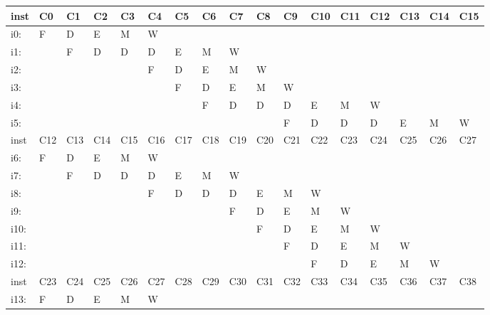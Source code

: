 \documentclass{article}
\begin{document}
\begin{table}[H]
\begin{tabular}{|l|l|l|l|l|l|l|l|l|l|l|l|l|l|l|l|l|}
\hline
inst & C0  & C1  & C2  & C3  & C4  & C5  & C6  & C7  & C8  & C9  & C10 & C11 & C12 & C13 & C14 & C15 \\ \hline
i0:  &  F  &  D  &  E  &  M  &  W  &     &     &     &     &     &     &     &     &     &     &     \\ \hline
i1:  &     &  F  &  D  &  D  &  D  &  E  &  M  &  W  &     &     &     &     &     &     &     &     \\ \hline
i2:  &     &     &     &     &  F  &  D  &  E  &  M  &  W  &     &     &     &     &     &     &     \\ \hline
i3:  &     &     &     &     &     &  F  &  D  &  E  &  M  &  W  &     &     &     &     &     &     \\ \hline
i4:  &     &     &     &     &     &     &  F  &  D  &  D  &  D  &  E  &  M  &  W  &     &     &     \\ \hline
i5:  &     &     &     &     &     &     &     &     &     &  F  &  D  &  D  &  D  &  E  &  M  &  W  \\ \hline
inst & C12 & C13 & C14 & C15 & C16 & C17 & C18 & C19 & C20 & C21 & C22 & C23 & C24 & C25 & C26 & C27 \\ \hline
i6:  &  F  &  D  &  E  &  M  &  W  &     &     &     &     &     &     &     &     &     &     &     \\ \hline
i7:  &     &  F  &  D  &  D  &  D  &  E  &  M  &  W  &     &     &     &     &     &     &     &     \\ \hline
i8:  &     &     &     &     &  F  &  D  &  D  &  D  &  E  &  M  &  W  &     &     &     &     &     \\ \hline
i9:  &     &     &     &     &     &     &     &  F  &  D  &  E  &  M  &  W  &     &     &     &     \\ \hline
i10: &     &     &     &     &     &     &     &     &  F  &  D  &  E  &  M  &  W  &     &     &     \\ \hline
i11: &     &     &     &     &     &     &     &     &     &  F  &  D  &  E  &  M  &  W  &     &     \\ \hline
i12: &     &     &     &     &     &     &     &     &     &     &  F  &  D  &  E  &  M  &  W  &      \\ \hline
inst & C23 & C24 & C25 & C26 & C27 & C28 & C29 & C30 & C31 & C32 & C33 & C34 & C35 & C36 & C37 & C38 \\ \hline
i13: &  F  &  D  &  E  &  M  &  W  &     &     &     &     &     &     &     &     &     &     &     \\ \hline

\end{tabular}
\end{table}
\end{document}
